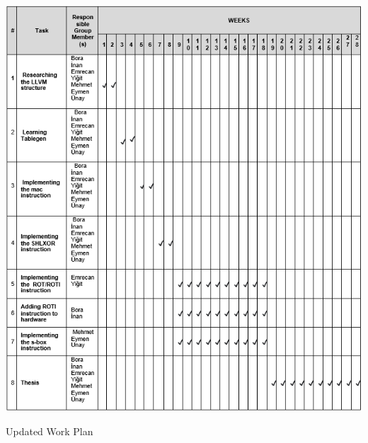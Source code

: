 \begin{table}
    \centering
    \includegraphics[width=\textwidth]{fig_general/work_plan.png}
    \caption{Updated Work Plan}
    \label{tab:work_plan}
\end{table}
